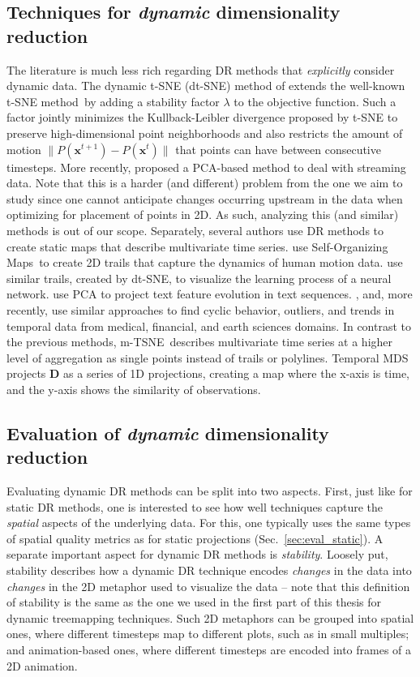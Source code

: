 \subsection{Techniques for \emph{dynamic} dimensionality reduction}
%
The literature is much less rich regarding DR methods that \emph{explicitly} consider dynamic data. The dynamic t-SNE (dt-SNE) method of \cite{Rauber2016} extends the well-known t-SNE method\,\citep{tsne} by adding a stability factor $\lambda$ to the objective function. Such a factor jointly minimizes the Kullback-Leibler divergence proposed by t-SNE to preserve high-dimensional point neighborhoods and also restricts the amount of motion $\| P(\mathbf{x}^{t+1}) - P(\mathbf{x}^t) \|$ that points can have between consecutive timesteps. More recently, \cite{Fujiwara2019} proposed a PCA-based method to deal with streaming data. Note that this is a harder (and different) problem from the one we aim to study since one cannot anticipate changes occurring upstream in the data when optimizing for placement of points in 2D. As such, analyzing this (and similar) methods is out of our scope. Separately, several authors use DR methods to create static maps that describe multivariate time series. \cite{Hu2010} use Self-Organizing Maps\,\citep{Kohonen1997} to create 2D trails that capture the dynamics of human motion data. \cite{Rauber2017} use similar trails, created by dt-SNE, to visualize the learning process of a neural network. \cite{Mao2007} use PCA to project text feature evolution in text sequences. \cite{Ward2011}, \cite{bws12} and, more recently, \cite{Ali2019} use similar approaches to find cyclic behavior, outliers, and trends in temporal data from medical, financial, and earth sciences domains.
%
In contrast to the previous methods, m-TSNE\,\citep{Nguyen2017} describes multivariate time series at a higher level of aggregation as single points instead of trails or polylines. Temporal MDS\,\citep{Jackle2016} projects $\mathbf{D}$ as a series of 1D projections, creating a map where the x-axis is time, and the y-axis shows the similarity of observations.

\subsection{Evaluation of \textit{dynamic} dimensionality reduction}
\label{sec:eval_dynamic}
%
Evaluating dynamic DR methods can be split into two aspects. First, just like for static DR methods, one is interested to see how well techniques capture the \emph{spatial} aspects of the underlying data. For this, one typically uses the same types of spatial quality metrics as for static projections (Sec.~\ref{sec:eval_static}). A separate important aspect for dynamic DR methods is \emph{stability}. Loosely put, stability describes how a dynamic DR technique encodes \emph{changes} in the data into \emph{changes} in the 2D metaphor used to visualize the data -- note that this definition of stability is the same as the one we used in the first part of this thesis for dynamic treemapping techniques.
Such 2D metaphors can be grouped into spatial ones, where different timesteps map to different plots, such as in small multiples; and animation-based ones, where different timesteps are encoded into frames of a 2D animation.

